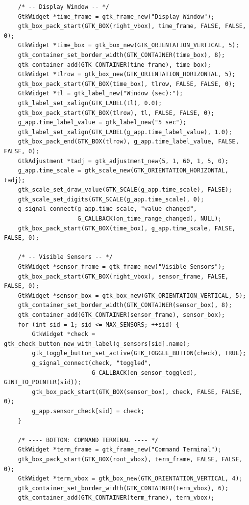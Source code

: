 \begin{verbatim}
    /* -- Display Window -- */
    GtkWidget *time_frame = gtk_frame_new("Display Window");
    gtk_box_pack_start(GTK_BOX(right_vbox), time_frame, FALSE, FALSE, 0);
    GtkWidget *time_box = gtk_box_new(GTK_ORIENTATION_VERTICAL, 5);
    gtk_container_set_border_width(GTK_CONTAINER(time_box), 8);
    gtk_container_add(GTK_CONTAINER(time_frame), time_box);
    GtkWidget *tlrow = gtk_box_new(GTK_ORIENTATION_HORIZONTAL, 5);
    gtk_box_pack_start(GTK_BOX(time_box), tlrow, FALSE, FALSE, 0);
    GtkWidget *tl = gtk_label_new("Window (sec):");
    gtk_label_set_xalign(GTK_LABEL(tl), 0.0);
    gtk_box_pack_start(GTK_BOX(tlrow), tl, FALSE, FALSE, 0);
    g_app.time_label_value = gtk_label_new("5 sec");
    gtk_label_set_xalign(GTK_LABEL(g_app.time_label_value), 1.0);
    gtk_box_pack_end(GTK_BOX(tlrow), g_app.time_label_value, FALSE, FALSE, 0);
    GtkAdjustment *tadj = gtk_adjustment_new(5, 1, 60, 1, 5, 0);
    g_app.time_scale = gtk_scale_new(GTK_ORIENTATION_HORIZONTAL, tadj);
    gtk_scale_set_draw_value(GTK_SCALE(g_app.time_scale), FALSE);
    gtk_scale_set_digits(GTK_SCALE(g_app.time_scale), 0);
    g_signal_connect(g_app.time_scale, "value-changed",
                     G_CALLBACK(on_time_range_changed), NULL);
    gtk_box_pack_start(GTK_BOX(time_box), g_app.time_scale, FALSE, FALSE, 0);

    /* -- Visible Sensors -- */
    GtkWidget *sensor_frame = gtk_frame_new("Visible Sensors");
    gtk_box_pack_start(GTK_BOX(right_vbox), sensor_frame, FALSE, FALSE, 0);
    GtkWidget *sensor_box = gtk_box_new(GTK_ORIENTATION_VERTICAL, 5);
    gtk_container_set_border_width(GTK_CONTAINER(sensor_box), 8);
    gtk_container_add(GTK_CONTAINER(sensor_frame), sensor_box);
    for (int sid = 1; sid <= MAX_SENSORS; ++sid) {
        GtkWidget *check = gtk_check_button_new_with_label(g_sensors[sid].name);
        gtk_toggle_button_set_active(GTK_TOGGLE_BUTTON(check), TRUE);
        g_signal_connect(check, "toggled",
                         G_CALLBACK(on_sensor_toggled), GINT_TO_POINTER(sid));
        gtk_box_pack_start(GTK_BOX(sensor_box), check, FALSE, FALSE, 0);
        g_app.sensor_check[sid] = check;
    }

    /* ---- BOTTOM: COMMAND TERMINAL ---- */
    GtkWidget *term_frame = gtk_frame_new("Command Terminal");
    gtk_box_pack_start(GTK_BOX(root_vbox), term_frame, FALSE, FALSE, 0);
    GtkWidget *term_vbox = gtk_box_new(GTK_ORIENTATION_VERTICAL, 4);
    gtk_container_set_border_width(GTK_CONTAINER(term_vbox), 6);
    gtk_container_add(GTK_CONTAINER(term_frame), term_vbox);


\end{verbatim}

